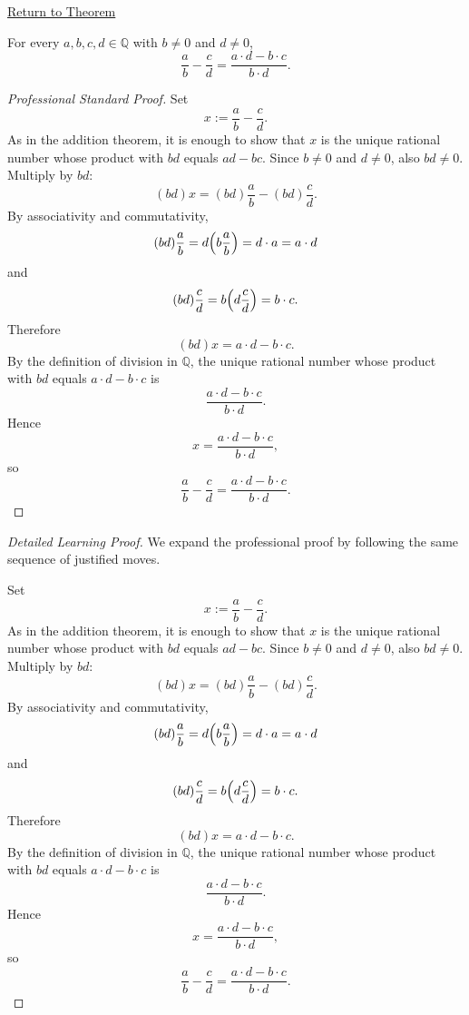 \newpage
{}
\label{prf:rational-fraction-subtraction}

\begin{remark*}[Return]
\hyperref[thm:rational-fraction-subtraction]{Return to Theorem}
\end{remark*}

\begin{theorem*}
For every $a,b,c,d\in\mathbb{Q}$ with $b\neq 0$ and $d\neq 0$,
\[
\frac{a}{b}-\frac{c}{d}
=
\frac{a\cdot d-b\cdot c}{b\cdot d}.
\]
\end{theorem*}

\begin{proof}[Professional Standard Proof]
\LRAProofBodyStart
Set
\[
x:=\frac{a}{b}-\frac{c}{d}.
\]
As in the addition theorem, it is enough to show that $x$ is the unique
rational number whose product with $bd$ equals $ad-bc$.  Since $b\neq 0$ and
$d\neq 0$, also $bd\neq 0$.  Multiply by $bd$:
\[
(bd)x=(bd)\frac{a}{b}-(bd)\frac{c}{d}.
\]
By associativity and commutativity,
\[
(bd)\frac{a}{b}=d\Bigl(b\frac{a}{b}\Bigr)=d\cdot a=a\cdot d
\]
and
\[
(bd)\frac{c}{d}=b\Bigl(d\frac{c}{d}\Bigr)=b\cdot c.
\]
Therefore
\[
(bd)x=a\cdot d-b\cdot c.
\]
By the definition of division in $\mathbb{Q}$, the unique rational number
whose product with $bd$ equals $a\cdot d-b\cdot c$ is
\[
\frac{a\cdot d-b\cdot c}{b\cdot d}.
\]
Hence
\[
x=\frac{a\cdot d-b\cdot c}{b\cdot d},
\]
so
\[
\frac{a}{b}-\frac{c}{d}
=
\frac{a\cdot d-b\cdot c}{b\cdot d}.
\]
\end{proof}

\begin{proof}[Detailed Learning Proof]
\LRAProofBodyStart
We expand the professional proof by following the same sequence of justified moves.

Set
\[
x:=\frac{a}{b}-\frac{c}{d}.
\]
As in the addition theorem, it is enough to show that $x$ is the unique
rational number whose product with $bd$ equals $ad-bc$.  Since $b\neq 0$ and
$d\neq 0$, also $bd\neq 0$.  Multiply by $bd$:
\[
(bd)x=(bd)\frac{a}{b}-(bd)\frac{c}{d}.
\]
By associativity and commutativity,
\[
(bd)\frac{a}{b}=d\Bigl(b\frac{a}{b}\Bigr)=d\cdot a=a\cdot d
\]
and
\[
(bd)\frac{c}{d}=b\Bigl(d\frac{c}{d}\Bigr)=b\cdot c.
\]
Therefore
\[
(bd)x=a\cdot d-b\cdot c.
\]
By the definition of division in $\mathbb{Q}$, the unique rational number
whose product with $bd$ equals $a\cdot d-b\cdot c$ is
\[
\frac{a\cdot d-b\cdot c}{b\cdot d}.
\]
Hence
\[
x=\frac{a\cdot d-b\cdot c}{b\cdot d},
\]
so
\[
\frac{a}{b}-\frac{c}{d}
=
\frac{a\cdot d-b\cdot c}{b\cdot d}.
\]
\end{proof}

